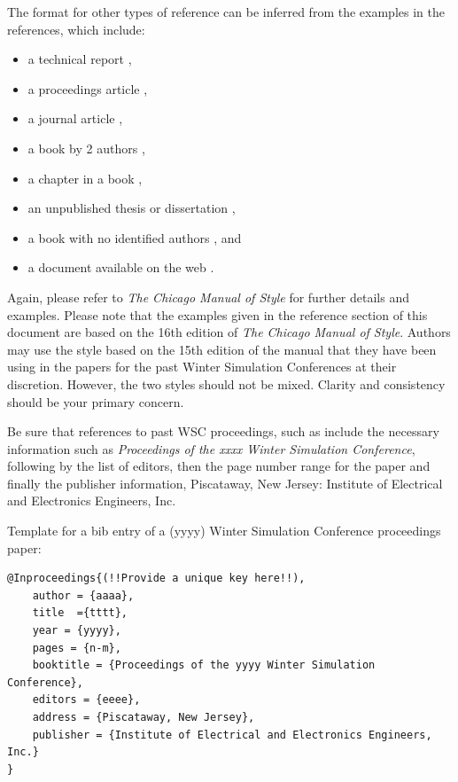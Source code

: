 \documentclass{wscpaperproc}
\theoremstyle{wsc}
\begin{document}
The format for other types of reference can be inferred from the examples in the references, which include:
\begin{itemize}
\item a technical report \cite{chi89},
\item a proceedings article \cite{cheng:input94},
\item a journal article \cite{gupta:mnormal},
\item a book by 2 authors \cite{hammersley:montecarlo},
\item a chapter in a book \cite{sch79},
\item an unpublished thesis or dissertation \cite{ste99},
\item a book with no identified authors \cite{chicago03}, and
\item a document available on the web \cite{WSC}.
\end{itemize}

Again, please refer to {\it The Chicago Manual of Style} \cite{chicago03} for further details and examples.
Please note that the examples given in the reference section of this document are based on the 16th edition of {\it The Chicago Manual of Style}.
Authors may use the style based on the 15th edition of the manual that they have been using in the papers for the past Winter Simulation Conferences at their discretion.
However, the two styles should not be mixed.  Clarity and consistency should be your primary concern.

Be sure that references to past WSC proceedings, such as  include the necessary information such as {\it Proceedings of the xxxx Winter Simulation Conference}, following by the list of editors, then the page number range for the paper and finally the publisher information, Piscataway, New Jersey: Institute of Electrical and Electronics Engineers, Inc.

Template for a bib entry of a (yyyy) Winter Simulation Conference proceedings paper:\newline


\begin{verbatim}
@Inproceedings{(!!Provide a unique key here!!),
	author = {aaaa},
	title  ={tttt},
	year = {yyyy},
	pages = {n-m},
	booktitle = {Proceedings of the yyyy Winter Simulation Conference},
	editors = {eeee},
	address = {Piscataway, New Jersey},
	publisher = {Institute of Electrical and Electronics Engineers, Inc.}
}
\end{verbatim}\vspace{5mm}
\end{document}
